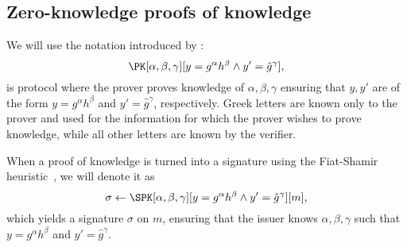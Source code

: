 \subsection{Zero-knowledge proofs of knowledge}%
\label{ZKPK}

We will use the notation introduced by \citet{PKnotation}:
\begin{equation}\label{PKexample}
  \PK[\alpha, \beta, \gamma][y = g^\alpha h^\beta \land y' = \hat g^\gamma],
\end{equation}
is  protocol where the prover proves knowledge of \(\alpha, \beta, 
\gamma\) ensuring that \(y, y'\) are of the form \(y = g^\alpha h^\beta\) and 
\(y' = \hat g^\gamma\), respectively.
Greek letters are known only to the prover and used for the information for which the prover wishes to prove knowledge, while all other letters are known by the verifier.

When a proof of knowledge is turned into a signature using the Fiat-Shamir heuristic~\cite{FiatShamirHeuristic}, we will denote it as
\begin{equation*}\label{SPKexample}
  \sigma\gets \SPK[\alpha, \beta, \gamma]%
  [y = g^\alpha h^\beta \land y' = \hat g^\gamma]%
  [m],
\end{equation*}
which yields a signature \(\sigma\) on \(m\), ensuring that the issuer knows \(\alpha, \beta, \gamma\) such that \(y = g^\alpha h^\beta\) and \(y' = \hat{g}^\gamma\).


